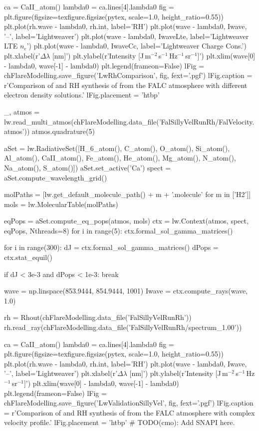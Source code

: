 \begin{pycode}[FlareModelling]
ca = CaII_atom()
lambda0 = ca.lines[4].lambda0
fig = plt.figure(figsize=texfigure.figsize(pytex, scale=1.0, height_ratio=0.55))
plt.plot(rh.wave - lambda0, rh.int, label='RH')
plt.plot(wave - lambda0, Iwave, '--', label='Lightweaver')
plt.plot(wave - lambda0, IwaveLte, label='Lightweaver LTE $n_e$')
plt.plot(wave - lambda0, IwaveCc, label='Lightweaver Charge Cons.')
plt.xlabel(r'$\Delta\lambda$ [nm]')
plt.ylabel(r'Intensity [J\,m$^{-2}$\,s$^{-1}$\,Hz$^{-1}$\,sr$^{-1}$]')
plt.xlim(wave[0] - lambda0, wave[-1] - lambda0)
plt.legend(frameon=False)
lFig = chFlareModelling.save_figure('LwRhComparison', fig, fext='.pgf')
lFig.caption = r'Comparison of \Lw{} and RH synthesis of \CaLine{} from the FALC atmosphere with different electron density solutions.'
lFig.placement = 'htbp'
\end{pycode}
\begin{pycode}[FlareModelling]

_, atmos = lw.read_multi_atmos(chFlareModelling.data_file('FalSillyVelRunRh/FalVelocity.atmos'))
atmos.quadrature(5)

aSet = lw.RadiativeSet([H_6_atom(), C_atom(), O_atom(), Si_atom(), Al_atom(),
                        CaII_atom(), Fe_atom(), He_atom(), Mg_atom(), N_atom(),
                        Na_atom(), S_atom()])
aSet.set_active('Ca')
spect = aSet.compute_wavelength_grid()

molPaths = [lw.get_default_molecule_path() + m + '.molecule' for m in ['H2']]
mols = lw.MolecularTable(molPaths)

eqPops = aSet.compute_eq_pops(atmos, mols)
ctx = lw.Context(atmos, spect, eqPops, Nthreads=8)
for i in range(5):
    ctx.formal_sol_gamma_matrices()

for i in range(300):
    dJ = ctx.formal_sol_gamma_matrices()
    dPops = ctx.stat_equil()

    if dJ < 3e-3 and dPops < 1e-3:
        break

wave = np.linspace(853.9444, 854.9444, 1001)
Iwave = ctx.compute_rays(wave, 1.0)

rh = Rhout(chFlareModelling.data_file('FalSillyVelRunRh'))
rh.read_ray(chFlareModelling.data_file('FalSillyVelRunRh/spectrum_1.00'))

ca = CaII_atom()
lambda0 = ca.lines[4].lambda0
fig = plt.figure(figsize=texfigure.figsize(pytex, scale=1.0, height_ratio=0.55))
plt.plot(rh.wave - lambda0, rh.int, label='RH')
plt.plot(wave - lambda0, Iwave, '--', label='Lightweaver')
plt.xlabel(r'$\Delta\lambda$ [nm]')
plt.ylabel(r'Intensity [J\,m$^{-2}$\,s$^{-1}$\,Hz$^{-1}$\,sr$^{-1}$]')
plt.xlim(wave[0] - lambda0, wave[-1] - lambda0)
plt.legend(frameon=False)
lFig = chFlareModelling.save_figure('LwValidationSillyVel', fig, fext='.pgf')
lFig.caption = r'Comparison of \Lw{} and RH synthesis of \CaLine{} from the FALC atmosphere with complex velocity profile.'
lFig.placement = 'htbp'
# TODO(cmo): Add SNAPI here.
\end{pycode}
